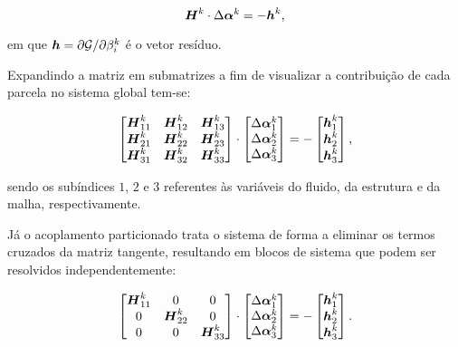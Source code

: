 \begin{equation}
    \boldsymbol{H}^k\cdot\Delta\boldsymbol{\alpha}^k=-\boldsymbol{h}^k\text{,}
\end{equation}

\noindent em que $\boldsymbol{h}=\partial\mathcal{G}/\partial\beta_i^k$ é o vetor resíduo.

Expandindo a matriz em submatrizes a fim de visualizar a contribuição de cada parcela no sistema global tem-se:

\begin{equation}
    \begin{bmatrix}
        \boldsymbol{H}_{11}^k & \boldsymbol{H}_{12}^k & \boldsymbol{H}_{13}^k \\
        \boldsymbol{H}_{21}^k & \boldsymbol{H}_{22}^k & \boldsymbol{H}_{23}^k \\
        \boldsymbol{H}_{31}^k & \boldsymbol{H}_{32}^k & \boldsymbol{H}_{33}^k
    \end{bmatrix}\cdot\begin{bmatrix}
        \Delta\boldsymbol{\alpha}_1^k \\\Delta\boldsymbol{\alpha}_2^k\\\Delta\boldsymbol{\alpha}_3^k
    \end{bmatrix}=-\begin{bmatrix}
        \boldsymbol{h}_1^k \\\boldsymbol{h}_2^k\\\boldsymbol{h}_3^k
    \end{bmatrix}\text{,}
\end{equation}

\noindent sendo os subíndices $1$, $2$ e $3$ referentes às variáveis do fluido, da estrutura e da malha, respectivamente.

Já o acoplamento particionado trata o sistema de forma a eliminar os termos cruzados da matriz tangente, resultando em blocos de sistema que podem ser resolvidos independentemente:

\begin{equation}
    \begin{bmatrix}
        \boldsymbol{H}_{11}^k & 0             & 0             \\
        0             & \boldsymbol{H}_{22}^k & 0             \\
        0             & 0             & \boldsymbol{H}_{33}^k
    \end{bmatrix}\cdot\begin{bmatrix}
        \Delta\boldsymbol{\alpha}_1^k \\\Delta\boldsymbol{\alpha}_2^k\\\Delta\boldsymbol{\alpha}_3^k
    \end{bmatrix}=-\begin{bmatrix}
        \boldsymbol{h}_1^k \\\boldsymbol{h}_2^k\\\boldsymbol{h}_3^k
    \end{bmatrix}\text{.}
\end{equation}

